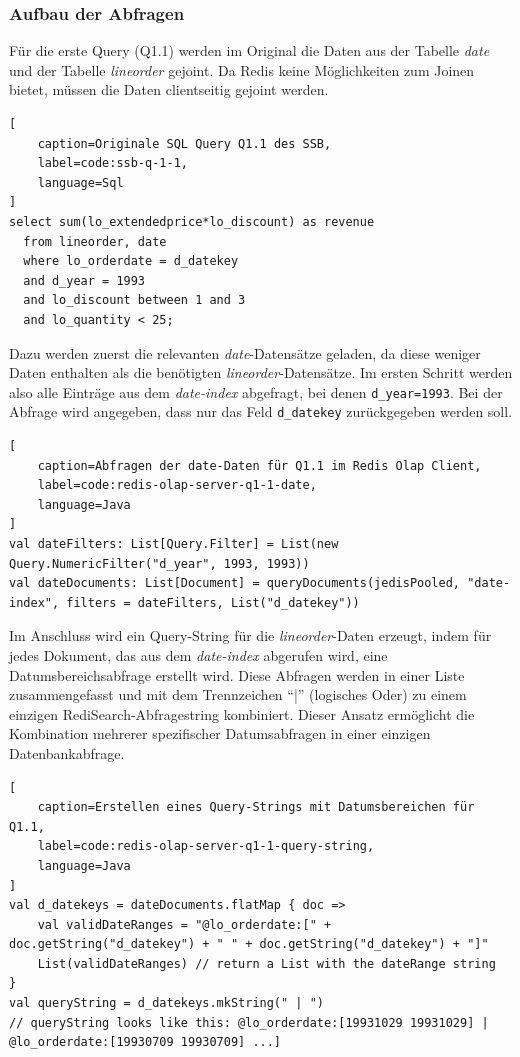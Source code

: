 \subsubsection{Aufbau der Abfragen}

Für die erste Query (Q1.1) werden im Original die Daten aus der Tabelle \emph{date} und der Tabelle \emph{lineorder} gejoint. Da Redis keine Möglichkeiten zum Joinen bietet, müssen die Daten clientseitig gejoint werden.

\begin{lstlisting}[
    caption=Originale SQL Query Q1.1 des SSB,
    label=code:ssb-q-1-1,
    language=Sql
]
select sum(lo_extendedprice*lo_discount) as revenue
  from lineorder, date
  where lo_orderdate = d_datekey
  and d_year = 1993
  and lo_discount between 1 and 3
  and lo_quantity < 25;
\end{lstlisting}

Dazu werden zuerst die relevanten \emph{date}-Datensätze geladen, da diese weniger Daten enthalten als die benötigten \emph{lineorder}-Datensätze. Im ersten Schritt werden also alle Einträge aus dem \emph{date-index} abgefragt, bei denen \lstinline|d_year=1993|. Bei der Abfrage wird angegeben, dass nur das Feld \lstinline|d_datekey| zurückgegeben werden soll.

\begin{lstlisting}[
    caption=Abfragen der date-Daten für Q1.1 im Redis Olap Client,
    label=code:redis-olap-server-q1-1-date,
    language=Java
]
val dateFilters: List[Query.Filter] = List(new Query.NumericFilter("d_year", 1993, 1993))
val dateDocuments: List[Document] = queryDocuments(jedisPooled, "date-index", filters = dateFilters, List("d_datekey"))
\end{lstlisting}

Im Anschluss wird ein Query-String für die \emph{lineorder}-Daten erzeugt, indem für jedes Dokument, das aus dem \emph{date-index} abgerufen wird, eine Datumsbereichsabfrage erstellt wird. Diese Abfragen werden in einer Liste zusammengefasst und mit dem Trennzeichen \enquote{|} (logisches Oder) zu einem einzigen RediSearch-Abfragestring kombiniert. Dieser Ansatz ermöglicht die Kombination mehrerer spezifischer Datumsabfragen in einer einzigen Datenbankabfrage.

\begin{lstlisting}[
    caption=Erstellen eines Query-Strings mit Datumsbereichen für Q1.1,
    label=code:redis-olap-server-q1-1-query-string,
    language=Java
]
val d_datekeys = dateDocuments.flatMap { doc =>
	val validDateRanges = "@lo_orderdate:[" + doc.getString("d_datekey") + " " + doc.getString("d_datekey") + "]"
	List(validDateRanges) // return a List with the dateRange string
}
val queryString = d_datekeys.mkString(" | ")
// queryString looks like this: @lo_orderdate:[19931029 19931029] | @lo_orderdate:[19930709 19930709] ...]
\end{lstlisting}


